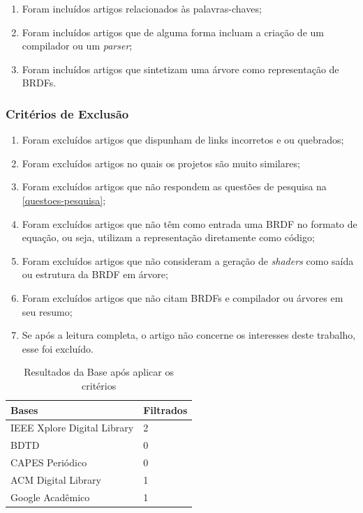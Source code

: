 \documentclass[english, 
               brazil, 
               bsc] %
               {dcomp-abntex2}
\begin{document}
\begin{enumerate}
  \item Foram incluídos artigos relacionados às palavras-chaves;
  \item Foram incluídos artigos que de alguma forma incluam a criação de um compilador ou um \textit{parser};
  \item Foram incluídos artigos que sintetizam uma árvore como representação de BRDFs.
\end{enumerate}


\subsubsection{Critérios de Exclusão}


\begin{enumerate}
  \item Foram excluídos artigos que dispunham de links incorretos e ou quebrados;
  \item Foram excluídos artigos no quais os projetos são muito similares;
  \item Foram excluídos artigos que não respondem as questões de pesquisa na \autoref{questoes-pesquisa};
  \item Foram excluídos artigos que não têm como entrada uma BRDF no formato de equação, ou seja, utilizam a representação diretamente como código;
  \item Foram excluídos artigos que não consideram a geração de \textit{shaders} como saída ou estrutura da BRDF em árvore;
  \item Foram excluídos artigos que não citam BRDFs e compilador ou árvores em seu resumo;
  \item Se após a leitura completa, o artigo não concerne os interesses deste trabalho, esse foi excluído.
\end{enumerate}




\begin{table}[H]
\ABNTEXfontereduzida
  \caption[bases]{Resultados da Base após aplicar os critérios}
\label{tab-result}
\begin{tabular}{p{6.6cm}|p{6.6cm}}
   \textbf{Bases}  & \textbf{Filtrados}\\
   \hline
    IEEE Xplore Digital Library
   & 2
    \\ \hline
    BDTD
    & 0
    \\ \hline
    CAPES Periódico
    & 0
    \\ \hline


  ACM Digital Library
  & 1
    \\ \hline
 Google Acadêmico 
  & 1
\end{tabular}
\end{table}
\end{document}
